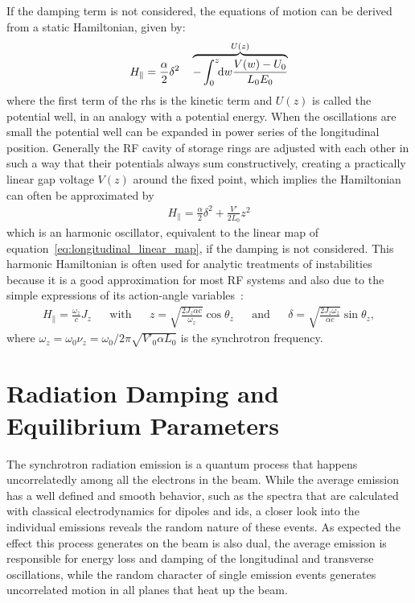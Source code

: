     If the damping term is not considered, the equations of motion can be derived from a static Hamiltonian, given by:
	\begin{align}\label{eq:longitudinal_hamiltonian}
		H_\parallel = \frac\alpha2\delta^2 \quad \overbrace{-
                            \defint{w}{\frac{V(w)-U_0}{L_0E_0}}{0}{z}
                        }^{U(z)}
	\end{align}
	where the first term of the \gls{rhs} is the kinetic term and $U(z)$ is called the potential well, in an analogy with a potential energy. When the oscillations are small the potential well can be expanded in power series of the longitudinal position. Generally the RF cavity of storage rings are adjusted with each other in such a way that their potentials always sum constructively, creating a practically linear gap voltage $V(z)$ around the fixed point, which implies the Hamiltonian can often be approximated by
    \begin{align}\label{eq:quadratic_potential_well}
        H_\parallel = \frac\alpha2\delta^2 + \frac{V'}{2L_0}z^2
    \end{align}
    which is an harmonic oscillator, equivalent to the linear map of equation~\eqref{eq:longitudinal_linear_map}, if the damping is not considered. This harmonic Hamiltonian is often used for analytic treatments of instabilities because it is a good approximation for most RF systems and also due to the simple expressions of its action-angle variables~\cite[sec. III]{Lindberg2016}:
    \begin{align}
        H_\parallel = \frac{\omega_z}{c}J_z && \text{with} &&
        z = \sqrt{\frac{2J_z \alpha c}{\omega_z}}\cos\theta_z && \text{and} &&
        \delta = \sqrt{\frac{2J_z\omega_z}{ \alpha c}}\sin\theta_z,
    \end{align}
    where $\omega_z = \omega_0\nu_z=\omega_0/2\pi\sqrt{V'_0\alpha L_0}$ is the synchrotron frequency.

\section{Radiation Damping and Equilibrium Parameters}

    The synchrotron radiation emission is a quantum process that happens uncorrelatedly among all the electrons in the beam. While the average emission has a well defined and smooth behavior, such as the spectra that are calculated with classical electrodynamics for dipoles and \glspl{id}, a closer look into the individual emissions reveals the random nature of these events. As expected the effect this process generates on the beam is also dual, the average emission is responsible for energy loss and damping of the longitudinal and transverse oscillations, while the random character of single emission events generates uncorrelated motion in all planes that heat up the beam.

